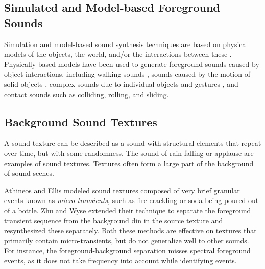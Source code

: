 \documentclass[twoside]{article}
\begin{document}


\subsection{Simulated and Model-based Foreground Sounds}

Simulation and model-based sound synthesis techniques are based on physical models of the 
objects, the world, and/or the interactions between these \cite{paper:85:CookBook}. 
Physically based models have been used to generate foreground sounds  
caused by object interactions, including walking sounds \cite{paper:85:Cook02}, sounds caused by the motion of 
solid objects \cite{paper:85:OBrien01}, complex sounds due to individual objects and gestures 
\cite{paper:85:Rocchesso03}, and contact sounds \cite{paper:85:Doel01} such as colliding, rolling, and 
sliding. 

\subsection{Background Sound Textures}

A sound texture can be described as a sound with structural elements 
that repeat over time, but with some randomness. The sound of rain falling 
or applause are examples of sound textures. 
Textures often form a large part of the background of sound scenes.

Athineos and Ellis \cite{paper:85:Athineos03} modeled sound textures composed of
very brief granular events known as \textit{micro-transients}, such as 
fire crackling or soda being poured out of a bottle. 
Zhu and Wyse \cite{paper:85:Zhu04} extended their technique to separate 
the foreground transient sequence from the background din in the source 
texture and resynthesized these separately. Both these methods are effective on textures 
that primarily contain micro-transients, but do not generalize well to other sounds. For 
instance, the foreground-background separation misses spectral foreground events, as it does 
not take frequency into account while identifying events.
\end{document}
